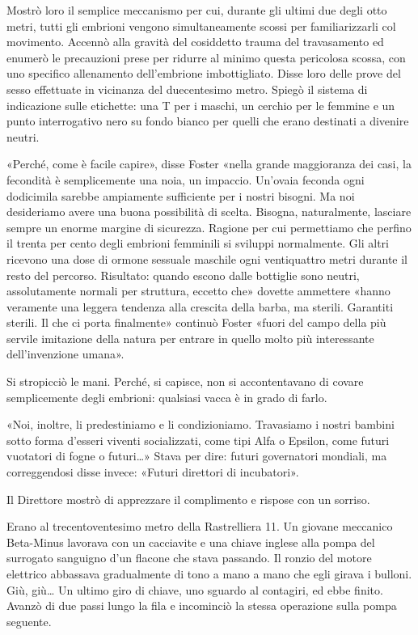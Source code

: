 \documentclass[
a5paper, %
10pt, %
twoside, 
onecolumn, %
openany, %
]{memoir}
\begin{document}
Mostrò loro il semplice meccanismo per cui, durante gli ultimi due degli otto metri, tutti gli embrioni vengono simultaneamente scossi per familiarizzarli col movimento. Accennò alla gravità del cosiddetto trauma del travasamento ed enumerò le precauzioni prese per ridurre al minimo questa pericolosa scossa, con uno specifico allenamento dell’embrione imbottigliato. Disse loro delle prove del sesso effettuate in vicinanza del duecentesimo metro. Spiegò il sistema di indicazione sulle etichette: una T per i maschi, un cerchio per le femmine e un punto interrogativo nero su fondo bianco per quelli che erano destinati a divenire neutri.

«Perché, come è facile capire», disse Foster «nella grande maggioranza dei casi, la fecondità è semplicemente una noia, un impaccio. Un’ovaia feconda ogni dodicimila sarebbe ampiamente sufficiente per i nostri bisogni. Ma noi desideriamo avere una buona possibilità di scelta. Bisogna, naturalmente, lasciare sempre un enorme margine di sicurezza. Ragione per cui permettiamo che perfino il trenta per cento degli embrioni femminili si sviluppi normalmente. Gli altri ricevono una dose di ormone sessuale maschile ogni ventiquattro metri durante il resto del percorso. Risultato: quando escono dalle bottiglie sono neutri, assolutamente normali per struttura, eccetto che» dovette ammettere «hanno veramente una leggera tendenza alla crescita della barba, ma sterili. Garantiti sterili. Il che ci porta finalmente» continuò Foster «fuori del campo della più servile imitazione della natura per entrare in quello molto più interessante dell’invenzione umana».

Si stropicciò le mani. Perché, si capisce, non si accontentavano di covare semplicemente degli embrioni: qualsiasi vacca è in grado di farlo.

«Noi, inoltre, li predestiniamo e li condizioniamo. Travasiamo i nostri bambini sotto forma d’esseri viventi socializzati, come tipi Alfa o Epsilon, come futuri vuotatori di fogne o futuri…» Stava per dire: futuri governatori mondiali, ma correggendosi disse invece: «Futuri direttori di incubatori».

Il Direttore mostrò di apprezzare il complimento e rispose con un sorriso.

Erano al trecentoventesimo metro della Rastrelliera 11. Un giovane meccanico Beta-Minus lavorava con un cacciavite e una chiave inglese alla pompa del surrogato sanguigno d’un flacone che stava passando. Il ronzio del motore elettrico abbassava gradualmente di tono a mano a mano che egli girava i bulloni. Giù, giù… Un ultimo giro di chiave, uno sguardo al contagiri, ed ebbe finito. Avanzò di due passi lungo la fila e incominciò la stessa operazione sulla pompa seguente.
\end{document}
